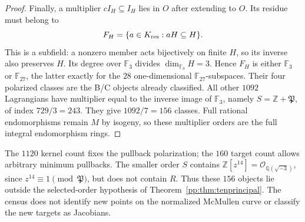\begin{proof}
Finally, a multiplier $cI_H\subseteq I_H$ lies in $O$ after
extending to $O$. Its residue must belong to
\[
 F_H=\{a\in K_{\rm res}:aH\subseteq H\}.
\]
This is a subfield: a nonzero member acts bijectively on finite $H$,
so its inverse also preserves $H$. Its degree over $\mathbb F_3$
divides $\dim_{\mathbb F_3}H=3$. Hence $F_H$ is either
$\mathbb F_3$ or $\mathbb F_{27}$, the latter exactly for the
$28$ one-dimensional $\mathbb F_{27}$-subspaces. Their four
polarized classes are the B/C objects already classified.
All other $1092$ Lagrangians have multiplier equal to the inverse
image of $\mathbb F_3$, namely $S=\mathbb Z+\mathfrak P$,
of index $729/3=243$. They give $1092/7=156$ classes.
Full rational endomorphisms remain $M$ by isogeny, so these
multiplier orders are the full integral endomorphism rings.
\end{proof}

The $1120$ kernel count fixes the pullback polarization; the $160$
target count allows arbitrary minimum pullbacks. The smaller order
$S$ contains $\mathbb Z[z^{14}]=\mathcal O_{\mathbb Q(\sqrt{-3})}$,
since $z^{14}\equiv1\pmod{\mathfrak P}$, but does not contain $R$.
Thus these $156$ objects lie outside the selected-order hypothesis
of Theorem~\ref{pp:thm:tenprincipal}. The census does not identify
new points on the normalized McMullen curve or classify the new
targets as Jacobians.



